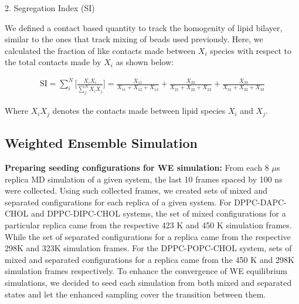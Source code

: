 \documentclass{biophys-new}
\begin{document}
2. Segregation Index (SI)

We defined a contact based quantity to track the homogenity of lipid bilayer, similar to the ones that track mixing of beads used previously\cite{Marigo2012,Kumar2020}.
Here, we calculated the fraction of like contacts made between $X_i$ species with respect to the total contacts made by $X_i$ as shown below:

\begin{equation}
    \begin{aligned}
    \label{eq:CLT}
    \text{SI} = \sum_{i}^{N}\Bigg[\frac{X_iX_i}{\sum_{j}^{N}X_iX_j}\Bigg] = \frac{X_{11}}{X_{11} + X_{12} + X_{13}} + \frac{X_{22}}{X_{21} + X_{22} + X_{23}} + \frac{X_{33}}{X_{31} + X_{32} + X_{33}}
    \end{aligned}
\end{equation}

Where $X_iX_j$ denotes the contacts made between lipid species $X_i$ and $X_j$. 

\subsection*{Weighted Ensemble Simulation}

\textbf{Preparing seeding configurations for WE simulation:} 
From each 8 $\mu$s replica MD simulation of a given system, the last 10 frames spaced by 100 ns were collected.
Using such collected frames, we created sets of mixed and separated configurations for each replica of a given system.
For DPPC-DAPC-CHOL and DPPC-DIPC-CHOL systems, the set of mixed configurations for a particular replica came from the respective 423 K and 450 K simulation frames. 
While the set of separated configurations for a replica came from  the respective 298K and 323K simulation frames.
For the DPPC-POPC-CHOL system, sets of mixed and separated configurations for a replica came from the 450 K and 298K simulation frames respectively.
To enhance the convergence of WE equilibrium simulations, we decided to seed each simulation from both mixed and separated states and let the enhanced sampling cover the transition between them.
\end{document}

